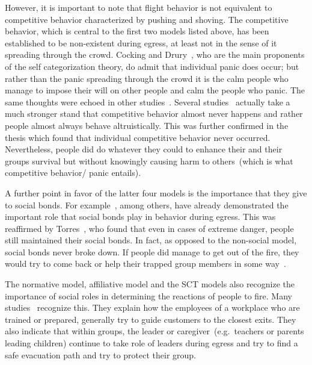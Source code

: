 However, it is important to note that flight behavior is not equivalent to competitive behavior characterized by pushing and shoving. The competitive behavior, which is central to the first two models listed above, has been established to be non-existent during egress, at least not in the sense of it spreading through the crowd. Cocking and Drury~\cite{Cocking:2005uc}, who are the main proponents of the self categorization theory, do admit that individual panic does occur; but rather than the panic spreading through the crowd it is the calm people who manage to impose their will on other people and calm the people who panic. The same thoughts were echoed in other studies~\cite{Paulsen:1984ti,Sime:1983uy,Schadschneider:2008cz}. Several studies~\cite{Sime:1983uy,Paulsen:1984ti,Drury:2009ga} actually take a much stronger stand that competitive behavior almost never happens and rather people almost always behave altruistically. This was further confirmed in the thesis which found that individual competitive behavior never occurred. Nevertheless, people did do whatever they could to enhance their and their groups survival but without knowingly causing harm to others~(which is what competitive behavior/ panic entails).

A further point in favor of the latter four models is the importance that they give to social bonds. For example~\cite{Cornwell:2003uo,Chertkoff:1996vw,Andree:2008td}, among others, have already demonstrated the important role that social bonds play in behavior during egress. This was reaffirmed by Torres~\cite{Torres:2010tj}, who found that even in cases of extreme danger, people still maintained their social bonds. In fact, as opposed to the non-social model, social bonds never broke down. If people did manage to get out of the fire, they would try to come back or help their trapped group members in some way~\cite{Torres:2010tj,Kobes:2009jx}.

The normative model, affiliative model and the SCT models also recognize the importance of social roles in determining the reactions of people to fire. Many studies~\cite{Proulx:2003tc,Proulx:2001we,Paulsen:1984ti,Sandberg:1997tw,Cocking:2008vv,Tong:1985wn} recognize this. They explain how the employees of a workplace who are trained or prepared, generally try to guide customers to the closest exits. They also indicate that within groups, the leader or caregiver~(e.g.\ teachers or parents leading children) continue to take role of leaders during egress and try to find a safe evacuation path and try to protect their group.

